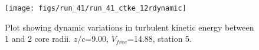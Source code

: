 \begin{figure}[H]
\centering
\texttt{[image: figs/run\_41/run\_41\_ctke\_12rdynamic]}
\caption{Plot showing dynamic variations in turbulent kinetic energy between 1 and 2 core radii. $z/c$=9.00, $V_{free}$=14.88, station 5.}
\label{fig:run_41_ctke_12rdynamic}
\end{figure}


